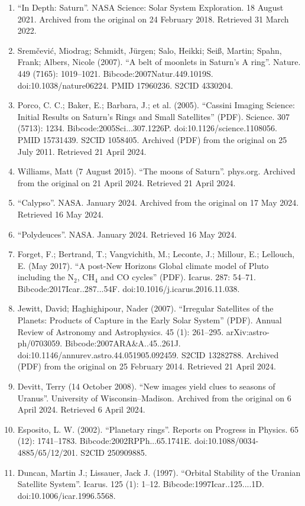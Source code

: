 \begin{enumerate}
\item ``In Depth: Saturn''. NASA Science: Solar System Exploration. 18 August 2021. Archived from the original on 24 February 2018. Retrieved 31 March 2022.
\item Sremčević, Miodrag; Schmidt, Jürgen; Salo, Heikki; Seiß, Martin; Spahn, Frank; Albers, Nicole (2007). ``A belt of moonlets in Saturn's A ring''. Nature. 449 (7165): 1019–1021. Bibcode:2007Natur.449.1019S. doi:10.1038/nature06224. PMID 17960236. S2CID 4330204.
\item Porco, C. C.; Baker, E.; Barbara, J.; et al. (2005). ``Cassini Imaging Science: Initial Results on Saturn's Rings and Small Satellites'' (PDF). Science. 307 (5713): 1234. Bibcode:2005Sci...307.1226P. doi:10.1126/science.1108056. PMID 15731439. S2CID 1058405. Archived (PDF) from the original on 25 July 2011. Retrieved 21 April 2024.
\item Williams, Matt (7 August 2015). ``The moons of Saturn''. phys.org. Archived from the original on 21 April 2024. Retrieved 21 April 2024.
\item ``Calypso''. NASA. January 2024. Archived from the original on 17 May 2024. Retrieved 16 May 2024.
\item ``Polydeuces''. NASA. January 2024. Retrieved 16 May 2024.
\item Forget, F.; Bertrand, T.; Vangvichith, M.; Leconte, J.; Millour, E.; Lellouch, E. (May 2017). ``A post-New Horizons Global climate model of Pluto including the N$_2$, CH$_4$ and CO cycles'' (PDF). Icarus. 287: 54–71. Bibcode:2017Icar..287...54F. doi:10.1016/j.icarus.2016.11.038.
\item Jewitt, David; Haghighipour, Nader (2007). ``Irregular Satellites of the Planets: Products of Capture in the Early Solar System'' (PDF). Annual Review of Astronomy and Astrophysics. 45 (1): 261–295. arXiv:astro-ph/0703059. Bibcode:2007ARA\&A..45..261J. doi:10.1146/annurev.astro.44.051905.092459. S2CID 13282788. Archived (PDF) from the original on 25 February 2014. Retrieved 21 April 2024.
\item Devitt, Terry (14 October 2008). ``New images yield clues to seasons of Uranus''. University of Wisconsin–Madison. Archived from the original on 6 April 2024. Retrieved 6 April 2024.
\item Esposito, L. W. (2002). ``Planetary rings''. Reports on Progress in Physics. 65 (12): 1741–1783. Bibcode:2002RPPh...65.1741E. doi:10.1088/0034-4885/65/12/201. S2CID 250909885.
\item Duncan, Martin J.; Lissauer, Jack J. (1997). ``Orbital Stability of the Uranian Satellite System''. Icarus. 125 (1): 1–12. Bibcode:1997Icar..125....1D. doi:10.1006/icar.1996.5568.

\end{enumerate}
